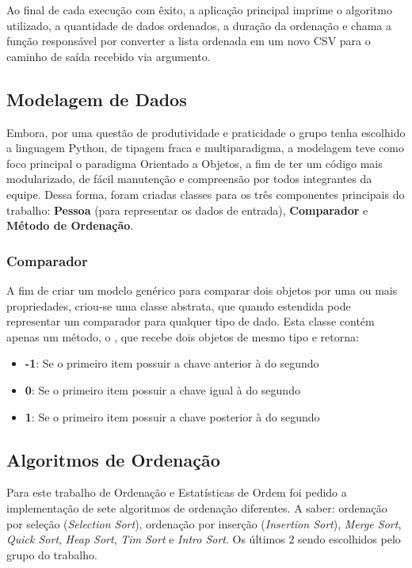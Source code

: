 \documentclass[a4paper,12pt]{scrartcl}
\begin{document}
Ao final de cada execução com êxito, a aplicação principal imprime o algoritmo utilizado, a quantidade de dados ordenados, a duração da ordenação e chama a função responsável por converter a lista ordenada em um novo CSV para o caminho de saída recebido via argumento.

\subsection{Modelagem de Dados}
Embora, por uma questão de produtividade e praticidade o grupo tenha escolhido a linguagem Python, de tipagem fraca e multiparadigma, a modelagem teve como foco principal o paradigma Orientado a Objetos, a fim de ter um código mais modularizado, de fácil manutenção e compreensão por todos integrantes da equipe. Dessa forma, foram criadas classes para os três componentes principais do trabalho: \textbf{Pessoa} (para representar os dados de entrada), \textbf{Comparador} e \textbf{Método de Ordenação}.

\subsubsection{Comparador}
A fim de criar um modelo genérico para comparar dois objetos por uma ou mais propriedades, criou-se uma classe abstrata, que quando estendida pode representar um comparador para qualquer tipo de dado. Esta classe contém apenas um método, o , que recebe dois objetos de mesmo tipo e retorna:
\begin{itemize}
    \item \textbf{-1}: Se o primeiro item possuir a chave anterior à do segundo
    \item \textbf{0}: Se o primeiro item possuir a chave igual à do segundo
    \item \textbf{1}: Se o primeiro item possuir a chave posterior à do segundo
\end{itemize}


\subsection{Algoritmos de Ordenação}
Para este trabalho de Ordenação e Estatísticas de Ordem foi pedido a implementação de sete algoritmos de ordenação diferentes. A saber: ordenação por seleção (\textit{Selection Sort}), ordenação por inserção (\textit{Insertion Sort}), \textit{Merge Sort}, \textit{Quick Sort}, \textit{Heap Sort}, \textit{Tim Sort} e \textit{Intro Sort}. Os últimos 2 sendo escolhidos pelo grupo do trabalho.
\end{document}
